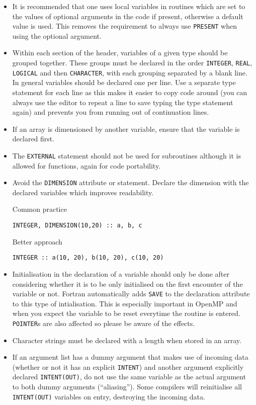 \begin{itemize}
\item It is recommended that one uses local variables in routines which are set
to the values of optional arguments
in the code if present, otherwise a default value is used.
This removes the requirement to always use \verb|PRESENT| when using the optional argument.
\item Within each section of the header,
variables of a given type should be grouped together.
These groups must be declared in the order
\verb|INTEGER|, \verb|REAL|, \verb|LOGICAL| and then
\verb|CHARACTER|, with each grouping separated by a blank line.
In general variables should be declared one per line.
Use a separate type statement for each line as this makes
it easier to copy code around
(you can always use the editor to repeat a line to save
typing the type statement again) and prevents you from running
out of continuation lines.
\item If an array is dimensioned by another variable, ensure that the variable is declared first.
\item The \verb|EXTERNAL| statement should not be used for subroutines although it is allowed for functions, again for code portability.
\item Avoid the \verb|DIMENSION| attribute or statement.
Declare the dimension with the declared variables which improves readability.

Common practice
\begin{verbatim}
INTEGER, DIMENSION(10,20) :: a, b, c
\end{verbatim}

Better approach
\begin{verbatim}
INTEGER :: a(10, 20), b(10, 20), c(10, 20)
\end{verbatim}

\item Initialisation in the declaration of a variable should only be done after considering
whether it is to be only initialised on the first encounter of the variable or not. Fortran automatically adds \verb|SAVE| to the
declaration attribute to this type of intialisation. This is especially important in OpenMP and when you expect the variable to be reset everytime the routine is entered.
\verb|POINTER|s are also affected so please be aware of the effects.
\item Character strings must be declared with a length when stored in an array.
\item If an argument list has a dummy argument that makes use of incoming data
(whether or not it has an explicit \verb|INTENT|) and another argument
explicitly declared \verb|INTENT(OUT)|, do not use the same variable as the
actual argument to both dummy arguments (``aliasing''). Some compilers will
reinitialise all \verb|INTENT(OUT)| variables on entry, destroying the incoming
data.


\end{itemize}
